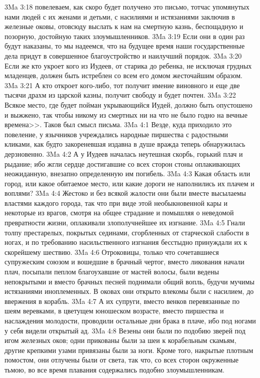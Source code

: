\vs 3Ma 3:18 повелеваем, как скоро будет получено это письмо, тотчас упомянутых нами людей с их женами и детьми, с насилиями и истязаниями заключив в железные оковы, отовсюду выслать к нам на смертную казнь, беспощадную и позорную, достойную таких злоумышленников.
\vs 3Ma 3:19 Если они в один раз будут наказаны, то мы надеемся, что на будущее время наши государственные дела придут в совершенное благоустройство и наилучший порядок.
\vs 3Ma 3:20 Если же кто укроет кого из Иудеев, от старика до ребенка, не исключая грудных младенцев, должен быть истреблен со всем его домом жесточайшим образом.
\vs 3Ma 3:21 А кто откроет кого-либо, тот получит имение виновного и еще две тысячи драхм из царской казны, получит свободу и будет почтен.
\vs 3Ma 3:22 Всякое место, где будет пойман укрывающийся Иудей, должно быть опустошено и выжжено, так чтобы никому из смертных ни на что не было годно на вечные времена>>. Таков был смысл письма.
\vs 3Ma 4:1 Везде, куда приходило это повеление, у язычников учреждались народные пиршества с радостными кликами, как будто закореневшая издавна в душе вражда теперь обнаружилась дерзновенно.
\vs 3Ma 4:2 А у Иудеев началась неутешная скорбь, горький плач и рыдание; ибо жгли сердце достигавшие со всех сторон стоны оплакивающих неожиданную, внезапно определенную им погибель.
\vs 3Ma 4:3 Какая область или город, или какое обитаемое место, или какие дороги не наполнились их плачем и воплями?
\vs 3Ma 4:4 Жестоко и без всякой жалости они были вместе высылаемы властями каждого города, так что при виде этой необыкновенной кары и некоторые из врагов, смотря на общее страдание и помышляя о неведомой превратности жизни, оплакивали злополучнейшее их изгнание.
\vs 3Ma 4:5 Гнали толпу престарелых, покрытых сединами, сгорбленных от старческой слабости в ногах, и по требованию насильственного изгнания бесстыдно принуждали их к скорейшему шествию.
\vs 3Ma 4:6 Отроковицы, только что сочетавшиеся супружеским союзом и вошедшие в брачный чертог, вместо ликования начали плач, посыпали пеплом благоухавшие от мастей волосы, были ведены непокрытыми и вместо брачных песней поднимали общий вопль, будучи мучимы истязаниями иноплеменных. В оковах они открыто влекомы были с насилием, до ввержения в корабль.
\vs 3Ma 4:7 А их супруги, вместо венков перевязанные по шеям веревками, в цветущем юношеском возрасте, вместо пиршества и наслаждения молодости, проводили остальные дни брака в плаче, ибо под ногами у себя видели открытый ад.
\vs 3Ma 4:8 Везены они были по подобию зверей под игом железных оков; одни прикованы были за шеи к корабельным скамьям, другие крепкими узами привязаны были за ноги. Кроме того, накрытые плотным помостом, они отлучены были от света, так что, со всех сторон окруженные тьмою, во все время плавания содержались подобно злоумышленникам.

